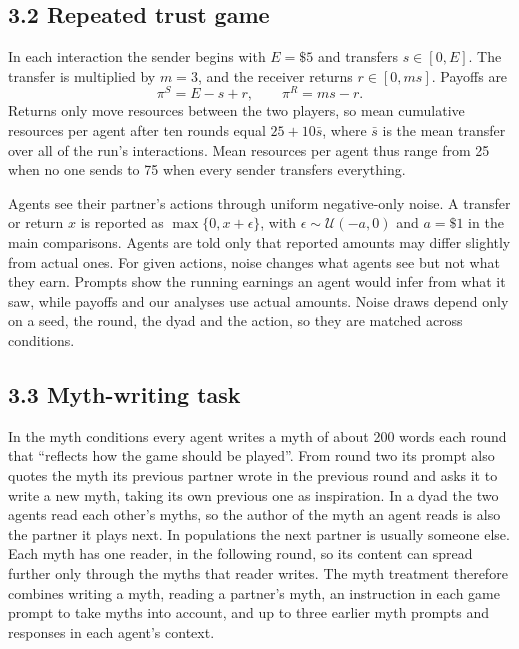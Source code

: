 \subsection{3.2 Repeated trust game}\label{repeated-trust-game}

In each interaction the sender begins with $E=\$5$ and transfers $s\in[0,E]$. The transfer is multiplied by $m=3$, and the receiver returns $r\in[0,ms]$. Payoffs are
\begin{equation}
\pi^{S}=E-s+r,
\qquad
\pi^{R}=ms-r.
\label{eq:tg-payoffs}
\end{equation}
Returns only move resources between the two players, so mean cumulative resources per agent after ten rounds equal $25+10\bar{s}$, where $\bar{s}$ is the mean transfer over all of the run's interactions. Mean resources per agent thus range from 25 when no one sends to 75 when every sender transfers everything.

Agents see their partner's actions through uniform negative-only noise. A transfer or return $x$ is reported as $\max\{0,x+\epsilon\}$, with $\epsilon\sim\mathcal{U}(-a,0)$ and $a=\$1$ in the main comparisons. Agents are told only that reported amounts may differ slightly from actual ones. For given actions, noise changes what agents see but not what they earn. Prompts show the running earnings an agent would infer from what it saw, while payoffs and our analyses use actual amounts. Noise draws depend only on a seed, the round, the dyad and the action, so they are matched across conditions.

\subsection{3.3 Myth-writing task}\label{myth-writing-task}

In the myth conditions every agent writes a myth of about 200 words each round that ``reflects how the game should be played''. From round two its prompt also quotes the myth its previous partner wrote in the previous round and asks it to write a new myth, taking its own previous one as inspiration. In a dyad the two agents read each other's myths, so the author of the myth an agent reads is also the partner it plays next. In populations the next partner is usually someone else. Each myth has one reader, in the following round, so its content can spread further only through the myths that reader writes. The myth treatment therefore combines writing a myth, reading a partner's myth, an instruction in each game prompt to take myths into account, and up to three earlier myth prompts and responses in each agent's context.

